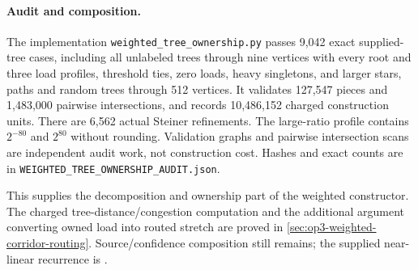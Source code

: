 \paragraph{Audit and composition.}
The implementation \texttt{weighted\_tree\_ownership.py} passes 9,042
exact supplied-tree cases, including all unlabeled trees through nine
vertices with every root and three load profiles, threshold ties,
zero loads, heavy singletons, and larger stars, paths and random trees
through 512 vertices. It validates 127,547 pieces and 1,483,000 pairwise
intersections, and records 10,486,152 charged construction units.
There are 6,562 actual Steiner refinements. The large-ratio profile
contains $2^{-80}$ and $2^{80}$ without rounding. Validation graphs and
pairwise intersection scans are independent audit work, not construction
cost. Hashes and exact counts are in
\texttt{WEIGHTED\_TREE\_OWNERSHIP\_AUDIT.json}.

This supplies the decomposition and ownership part of the weighted
constructor. The charged tree-distance/congestion computation and the
additional argument converting owned load into routed stretch are proved
in \cref{sec:op3-weighted-corridor-routing}. Source/confidence composition
still remains; the supplied near-linear recurrence is \statusconditional.
